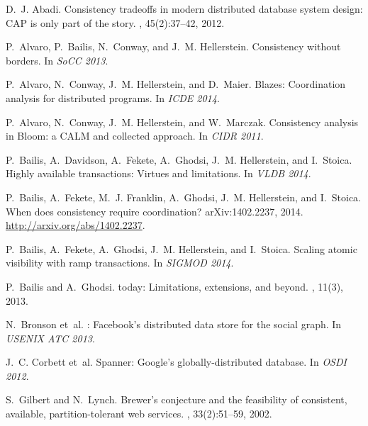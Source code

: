 \documentclass[9pt]{article}
\theoremstyle{definition}
\theoremstyle{remark}
\begin{document}


\begin{thebibliography}{10}

D.~J. Abadi.
\newblock Consistency tradeoffs in modern distributed database system design:
  {CAP} is only part of the story.
, 45(2):37--42, 2012.

P.~Alvaro, P.~Bailis, N.~Conway, and J.~M. Hellerstein.
\newblock Consistency without borders.
\newblock In {\em SoCC 2013}.

P.~Alvaro, N.~Conway, J.~M. Hellerstein, and D.~Maier.
\newblock Blazes: Coordination analysis for distributed programs.
\newblock In {\em ICDE 2014}.

P.~Alvaro, N.~Conway, J.~M. Hellerstein, and W.~Marczak.
\newblock Consistency analysis in {Bloom}: a {CALM} and collected approach.
\newblock In {\em CIDR 2011}.

P.~Bailis, A.~Davidson, A.~Fekete, A.~Ghodsi, J.~M. Hellerstein, and I.~Stoica.
\newblock Highly available transactions: Virtues and limitations.
\newblock In {\em VLDB 2014}.

P.~Bailis, A.~Fekete, M.~J. Franklin, A.~Ghodsi, J.~M. Hellerstein, and
  I.~Stoica.
\newblock When does consistency require coordination?
\newblock arXiv:1402.2237, 2014.
\newblock \url{http://arxiv.org/abs/1402.2237}.

P.~Bailis, A.~Fekete, A.~Ghodsi, J.~M. Hellerstein, and I.~Stoica.
\newblock Scaling atomic visibility with ramp transactions.
\newblock In {\em SIGMOD 2014}.

P.~Bailis and A.~Ghodsi.
 today: Limitations, extensions, and beyond.
, 11(3), 2013.

N.~Bronson et~al.
: {Facebook's} distributed data store for the social graph.
\newblock In {\em USENIX ATC 2013}.

J.~C. Corbett et~al.
\newblock Spanner: Google's globally-distributed database.
\newblock In {\em OSDI 2012}.

S.~Gilbert and N.~Lynch.
\newblock Brewer's conjecture and the feasibility of consistent, available,
  partition-tolerant web services.
, 33(2):51--59, 2002.


\end{thebibliography}
\end{document}
